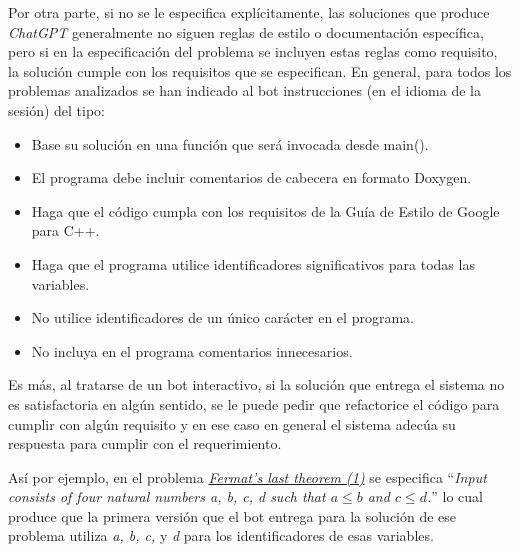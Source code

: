 \documentclass[twocolumn,twoside,a4paper, 10pt]{article}
\newcommand{\ChatGPT}{\textit{ChatGPT}{}}           %
\begin{document}
Por otra parte, si no se le especifica explícitamente, las soluciones que produce \ChatGPT{} generalmente no
siguen reglas de estilo o documentación específica, pero si en la especificación del problema se incluyen
estas reglas como requisito, la solución cumple con los requisitos que se especifican.
En general, para todos los problemas analizados se han indicado al bot instrucciones (en el idioma de la
sesión) del tipo:
\begin{center}
    \begin{minipage}{\linewidth}
        {\small
        \begin{itemize}
          \item Base su solución en una función que será invocada desde main().
          \item El programa debe incluir comentarios de cabecera en formato Doxygen.
          \item Haga que el código cumpla con los requisitos de la Guía de Estilo de Google para C++.
          \item Haga que el programa utilice identificadores significativos para todas las variables.
          \item No utilice identificadores de un único carácter en el programa.
          \item No incluya en el programa comentarios innecesarios.
        \end{itemize}
        }
    \end{minipage}
\end{center}
Es más, al tratarse de un bot interactivo, si la solución que entrega el sistema no es satisfactoria en algún
sentido, se le puede pedir que refactorice el código para cumplir con algún requisito y en ese caso en general
el sistema adecúa su respuesta para cumplir con el requerimiento.

Así por ejemplo, en el problema
\href{https://jutge.org/problems/P36430_en/statement}{\textit{Fermat's last theorem (1)}}
se especifica ``\textit{Input consists of four natural numbers a, b, c, d such that $a \leq b$ and $c \leq d$.}'' 
lo cual produce que la primera versión que el bot entrega para la solución de ese problema utiliza 
\textit{a, b, c,} y \textit{d} para los identificadores de esas variables.
\end{document}
